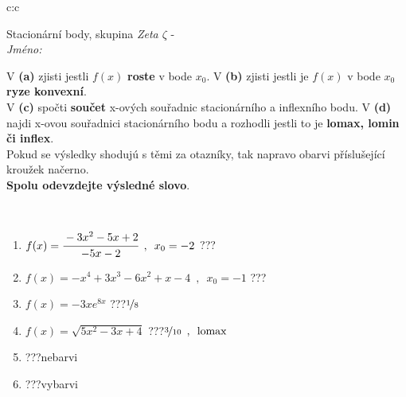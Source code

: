 \documentclass[10pt]{report}
\begin{document}
\newpage
\thispagestyle{empty}
\begin{tabular}{c:c}
\begin{minipage}[c][104.5mm][t]{0.5\linewidth}
\begin{center}
\vspace{7mm}
{\huge Stacionární body, skupina \textit{Zeta $\zeta$} -}\\[5mm]
\textit{Jméno:}\phantom{xxxxxxxxxxxxxxxxxxxxxxxxxxxxxxxxxxxxxxxxxxxxxxxxxxxxxxxxxxxxxxxxx}\\[5mm]
\begin{minipage}{0.95\linewidth}
\begin{center}
{\small V \textbf{(a)} zjisti jestli $f(x)$ \textbf{roste} v bode $x_0$. V \textbf{(b)} zjisti jestli je $f(x)$ v bode $x_0$ \textbf{ryze konvexní}.\\V \textbf{(c)} spočti \textbf{součet} x-ových souřadnic stacionárního a inflexního bodu. V \textbf{(d)} najdi x-ovou souřadnici stacionárního bodu a rozhodli jestli to je \textbf{lomax, lomin či inflex}.\\Pokud se výsledky shodujú s těmi za otazníky, tak napravo obarvi příslušející kroužek načerno.\\\textbf{Spolu odevzdejte výsledné slovo}}.
\end{center}
\end{minipage}
\\[1mm]
\begin{minipage}{0.79\linewidth}
\begin{center}
\begin{varwidth}{\linewidth}
\begin{enumerate}
\normalsize
\item $f(x)=\cfrac{-3x^2-5x+2}{-5x-2}\enspace , \enspace x_0=-2$\quad \dotfill\; ???\;\dotfill \quad {}
\item $f(x)=-x^4+3x^3-6x^2+x-4\enspace , \enspace x_0=-1$\quad \dotfill\; ???\;\dotfill \quad {}
\item $f(x)=-3xe^{8x}$\quad \dotfill\; ???\;\dotfill \quad $\nicefrac{1}{8}$
\item $f(x)=\sqrt{5x^2-3x+4}$\quad \dotfill\; ???\;\dotfill \quad $\nicefrac{3}{10}\enspace , \enspace\mathrm{lomax}$
\item \quad \dotfill\; ???\;\dotfill \quad nebarvi
\item \quad \dotfill\; ???\;\dotfill \quad vybarvi
\end{enumerate}
\end{varwidth}
\end{center}

\end{minipage}
\end{center}
\end{minipage}
\end{tabular}
\end{document}
